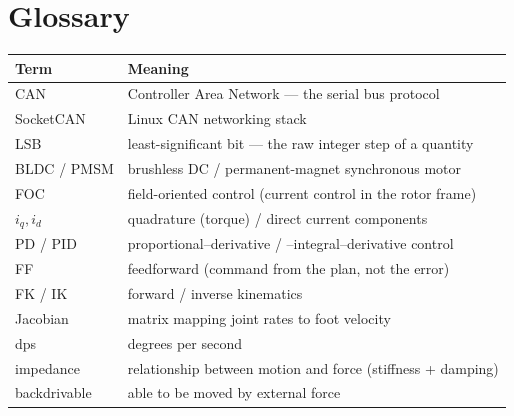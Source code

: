 \documentclass[11pt,a4paper]{article}
\begin{document}
\section{Glossary}
\begin{center}
\begin{tabular}{@{}ll@{}}
\toprule
\textbf{Term} & \textbf{Meaning} \\
\midrule
CAN          & Controller Area Network --- the serial bus protocol \\
SocketCAN    & Linux CAN networking stack \\
LSB          & least-significant bit --- the raw integer step of a quantity \\
BLDC / PMSM  & brushless DC / permanent-magnet synchronous motor \\
FOC          & field-oriented control (current control in the rotor frame) \\
$i_q,i_d$    & quadrature (torque) / direct current components \\
PD / PID     & proportional--derivative / --integral--derivative control \\
FF           & feedforward (command from the plan, not the error) \\
FK / IK      & forward / inverse kinematics \\
Jacobian     & matrix mapping joint rates to foot velocity \\
dps          & degrees per second \\
impedance    & relationship between motion and force (stiffness + damping) \\
backdrivable & able to be moved by external force \\
\bottomrule
\end{tabular}
\end{center}
\end{document}
